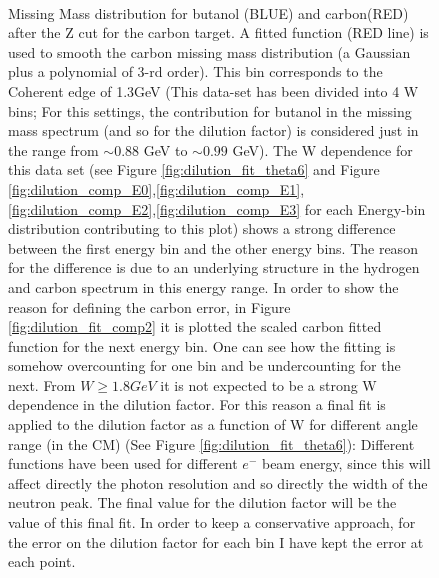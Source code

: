 \begin{figure}[htb]
  \begin{center}
     \\
    \caption{Missing Mass distribution for butanol (BLUE) and carbon(RED) after the Z cut for the carbon target. A fitted function (RED line)  is used to smooth the carbon missing mass distribution (a Gaussian plus a polynomial of 3-rd order). This bin corresponds to the Coherent edge of 1.3GeV (This data-set has been divided into 4 W bins; For this settings, the contribution for butanol in the missing mass spectrum (and so for the dilution factor) is considered just in the range from $\sim 0.88$ GeV to $\sim 0.99$ GeV). The W dependence for this data set (see Figure \ref{fig:dilution_fit_theta6} and Figure \ref{fig:dilution_comp_E0},\ref{fig:dilution_comp_E1},\ref{fig:dilution_comp_E2},\ref{fig:dilution_comp_E3} for each Energy-bin distribution contributing to this plot) shows a strong difference between the first energy bin and the other energy bins. The reason for the difference is due to an underlying structure in the hydrogen and carbon spectrum in this energy range. In order to show the reason for defining the carbon error, in Figure \ref{fig:dilution_fit_comp2} it is plotted the scaled carbon fitted function for the next energy bin. One can see how the fitting is somehow overcounting for one bin and be undercounting for the next. From $W\geq 1.8 GeV$ it is not expected to be a strong W dependence in the dilution factor. For this reason a final fit is applied to the dilution factor as a function of W for different angle range (in the CM) (See Figure \ref{fig:dilution_fit_theta6}): Different functions have been used for different $e^-$ beam energy, since this will affect directly the photon resolution and so directly the width of the neutron peak. The final value for the dilution factor will be the value of this final fit. In order to keep a conservative approach, for the error on the dilution factor for each bin I have kept the error at each point. }
    \label{fig:dilution_fit_comp}
  \end{center}
\end{figure}


